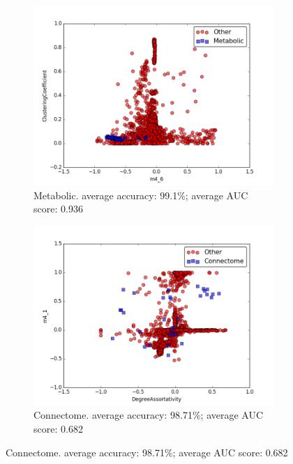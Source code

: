 \documentclass{article}
\begin{document}
\begin{figure}[H]
\medskip
\begin{subfigure}{0.48\textwidth}
\includegraphics[width=\linewidth]{figs/one_by_many/metabolic/2d.png}
\caption{Metabolic. average accuracy: 99.1\%; average AUC score: 0.936} \label{metabolic_2d}
\end{subfigure}\hspace*{\fill}
\begin{subfigure}{0.48\textwidth}
\includegraphics[width=\linewidth]{figs/one_by_many/connectome/2d.png}
\caption{Connectome. average accuracy: 98.71\%; average AUC score: 0.682} \label{connectome_2d}
\end{subfigure}


\end{figure}
\end{document}
